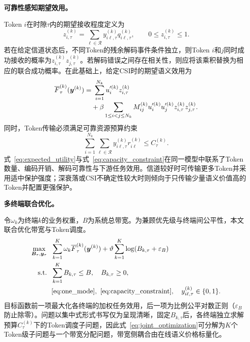 \documentclass[journal]{IEEEtran}
\begin{document}
\textbf{可靠性感知期望效用。}

Token $i$在时隙$\tau$内的期望接收程度定义为
\begin{equation}
z_{i,\tau}^{(k)}
=\sum_{\ell\in\mathcal R}
y_{i\ell,\tau}^{(k)}q_{i\ell,\tau}^{(k)},
\qquad 0\leq z_{i,\tau}^{(k)}\leq1.
\label{eq:expected_reception}
\end{equation}
若在给定信道状态后，不同Token的残余解码事件条件独立，则Token $i$和$j$同时成功接收的概率为$z_{i,\tau}^{(k)}z_{j,\tau}^{(k)}$。若解码错误之间存在相关性，则应将该乘积替换为相应的联合成功概率。在此基础上，给定CSI时的期望语义效用为
\begin{align}
\overline F_{\tau}^{(k)}(\bm y^{(k)})
=&~\sum_{i=1}^{N_k}u_i^{\prime(k)}z_{i,\tau}^{(k)}
\notag\\[-0.2em]
&+\beta\sum_{1\leq i<j\leq N_k}
M_{ij}^{(k)}u_i^{\prime(k)}u_j^{\prime(k)}
z_{i,\tau}^{(k)}z_{j,\tau}^{(k)}.
\label{eq:expected_utility}
\end{align}
同时，Token传输必须满足可靠资源预算约束
\begin{equation}
\sum_{i=1}^{N_k}\sum_{\ell\in\mathcal R}
y_{i\ell,\tau}^{(k)}r_{i\ell}^{(k)}
\leq C_{\tau}^{(k)}.
\label{eq:capacity_constraint}
\end{equation}
式~\eqref{eq:expected_utility}与式~\eqref{eq:capacity_constraint}在同一模型中联系了Token数量、编码开销、解码可靠性与下游任务效用。信道较好时可传输更多Token并采用适中保护强度；深衰落或CSI不确定性较大时则倾向于只传输少量语义价值高的Token并配置更强保护。

\textbf{多终端联合优化。}

令$\omega_k$为终端$k$的业务权重，$B$为系统总带宽。为兼顾优先级与终端间公平性，本文联合优化带宽与Token调度。
\begin{align}
\max_{\bm B_{\tau},\bm y_{\tau}}~~
&\sum_{k=1}^{K}\omega_k\overline F_{\tau}^{(k)}(\bm y^{(k)})
+\vartheta\sum_{k=1}^{K}\log(B_{k,\tau}+\varepsilon_B)
\label{eq:joint_optimization}\\
\mathrm{s.t.}~~
&\sum_{k=1}^{K}B_{k,\tau}\leq B,\quad B_{k,\tau}\geq0,
\label{eq:bandwidth_constraint}\\
&\eqref{eq:one_mode},~\eqref{eq:capacity_constraint},
\quad y_{i\ell,\tau}^{(k)}\in\{0,1\}.
\notag
\end{align}
目标函数前一项最大化各终端的加权任务效用，后一项为比例公平对数正则（$\varepsilon_B$防止除零）。问题以集中式形式书写仅为呈现清晰，固定$B_{k,\tau}$后，各终端独立求解预算$C_{\tau}^{(k)}$下的Token调度子问题，因此式~\eqref{eq:joint_optimization}可分解为$K$个Token级子问题与一个带宽分配问题，带宽侧耦合由在线语义价格标量化。
\end{document}
